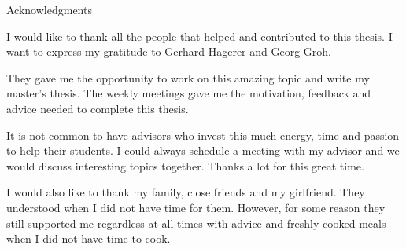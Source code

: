 \thispagestyle{empty}

\vspace*{20mm}

\begin{center}
{ Acknowledgments}
\end{center}

\vspace{10mm}

I would like to thank all the people that helped and contributed to this thesis. I want to express my gratitude to Gerhard Hagerer and Georg Groh. 
\medskip

They gave me the opportunity to work on this amazing topic and write my master's thesis. The weekly meetings gave me the motivation, feedback and advice needed to complete this thesis. 
\medskip

It is not common to have advisors who invest this much energy, time and passion to help their students. I could always schedule a meeting with my advisor and we would discuss interesting topics together. Thanks a lot for this great time.
\medskip

I would also like to thank my family, close friends and my girlfriend. They understood when I did not have time for them. However, for some reason they still supported me regardless at all times with advice and freshly cooked meals when I did not have time to cook.
\cleardoublepage{}
